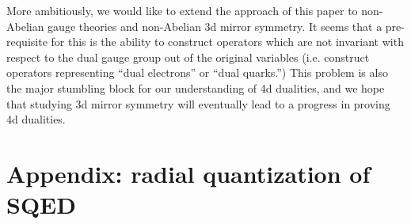 \documentclass[a4paper,12pt, amsfonts, amssymb]{article}
\begin{document}
More ambitiously, we would like to extend the approach of this paper to
non-Abelian gauge theories and non-Abelian 3d mirror symmetry. It seems
that a pre-requisite for this is the ability to construct 
operators which are not invariant with respect to the dual gauge group
out of the original variables (i.e. construct operators representing
``dual electrons'' or ``dual quarks.'') This problem is also
the major stumbling block for our understanding of 4d dualities, and we
hope that studying 3d mirror symmetry will eventually lead to a progress
in proving 4d dualities.

\section{Appendix: radial quantization of \coordHE{} SQED}
\end{document}
